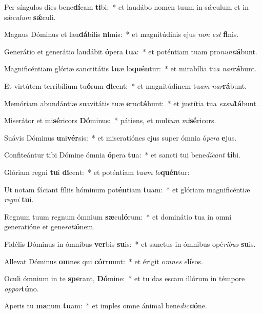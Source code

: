 \item Per síngulos dies bene\textbf{dí}cam \textbf{ti}bi:~* et laudábo nomen tuum in sǽculum et in sǽ\tinyhspace\textit{culum} \textbf{sǽ}culi.
\item Magnus Dóminus et lau\textbf{dá}bilis \textbf{ni}mis:~* et magnitúdinis ejus \textit{non} \textit{est} \textbf{fi}nis.
\item Generátio et generátio laudábit \textbf{ó}pera \textbf{tu}a:~* et poténtiam tuam pro\textit{nunti}\textbf{á}bunt.
\item Magnificéntiam glóriæ sanctitátis \textbf{tu}æ lo\textbf{quén}tur:~* et mirabília tu\tinyhspace\textit{a} \textit{nar}\textbf{rá}bunt.
\item Et virtútem terribílium tu\textbf{ó}rum \textbf{di}cent:~* et magnitúdinem tu\tinyhspace\textit{am} \textit{nar}\textbf{rá}bunt.
\item Memóriam abundántiæ suavitátis tuæ \textbf{e}ruc\textbf{tá}bunt:~* et justítia tua \textit{exsul}\textbf{tá}bunt.
\item Miserátor et mi\textbf{sé}ricors \textbf{Dó}minus:~* pátiens, et mul\textit{tum} \textit{mi}\textbf{sé}ricors.
\item Suávis Dóminus \textbf{u}ni\textbf{vér}sis:~* et miseratiónes ejus super ómnia ó\textit{pera} \textbf{e}jus.
\item Confiteántur tibi Dómine ómnia \textbf{ó}pera \textbf{tu}a:~* et san\-cti tui bene\tinyhspace\textit{dícant} \textbf{ti}bi.
\item Glóriam regni \textbf{tu}i \textbf{di}cent:~* et poténtiam tu\tinyhspace\textit{am} \textit{lo}\textbf{quén}tur:
\item Ut notam fáciant fíliis hóminum pot\textbf{én}tiam \textbf{tu}am:~* et glóriam magnificéntiæ \textit{regni} \textbf{tu}i.
\item Regnum tuum regnum ómnium \textbf{sæ}cu\textbf{ló}rum:~* et dominátio tua in o\-mni generatióne et gene\textit{rati}\textbf{ó}nem.
\item Fidélis Dóminus in ómnibus \textbf{ver}bis \textbf{su}is:~* et sanctus in ó\-mnibus opé\textit{ribus} \textbf{su}is.
\item Allevat Dóminus \textbf{om}nes qui \textbf{cór}ruunt:~* et érigit o\textit{mnes} \textit{e}\textbf{lí}sos.
\item Oculi ómnium in te \textbf{spe}rant, \textbf{Dó}mine:~* et tu das escam illórum in témpore \textit{oppor}\textbf{tú}no.
\item Aperis tu \textbf{ma}num \textbf{tu}am:~* et imples omne ánimal bene\tinyhspace\textit{dicti}\textbf{ó}ne.
